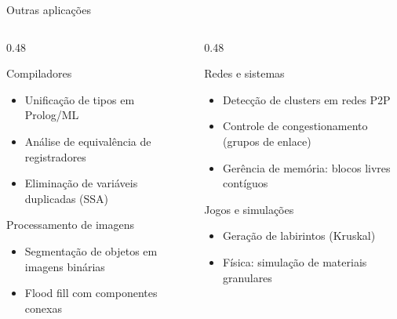\documentclass[aspectratio=169]{beamer}
\begin{document}
\begin{frame}[shrink=5]{Outras aplicações}%
  \begin{columns}[T]
    \begin{column}{0.48\textwidth}
      \begin{block}{Compiladores}
        \begin{itemize}
          \item Unificação de tipos em Prolog/ML
          \item Análise de equivalência de registradores
          \item Eliminação de variáveis duplicadas (SSA)
        \end{itemize}
      \end{block}
      \vspace{0.3cm}
      \begin{block}{Processamento de imagens}
        \begin{itemize}
          \item Segmentação de objetos em imagens binárias
          \item Flood fill com componentes conexas
        \end{itemize}
      \end{block}
    \end{column}
    \begin{column}{0.48\textwidth}
      \begin{block}{Redes e sistemas}
        \begin{itemize}
          \item Detecção de clusters em redes P2P
          \item Controle de congestionamento (grupos de enlace)
          \item Gerência de memória: blocos livres contíguos
        \end{itemize}
      \end{block}
      \vspace{0.3cm}
      \begin{block}{Jogos e simulações}
        \begin{itemize}
          \item Geração de labirintos (Kruskal)
          \item Física: simulação de materiais granulares
        \end{itemize}
      \end{block}
    \end{column}
  \end{columns}
\end{frame}
\end{document}
